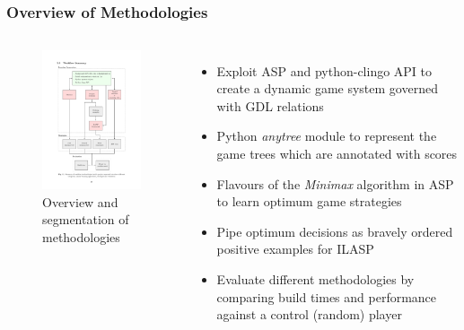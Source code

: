 \documentclass{beamer}
\begin{document}
\subsection{}
\begin{framefont}{\footnotesize}
  \begin{frame}
    \frametitle{Overview of Methodologies}
    \begin{columns}
      \vspace{-20pt}
      \begin{figure}
        \centering
        \includegraphics[trim={3cm 4cm 3cm 3.5cm},clip,width=4.8cm]{workflow.pdf}
        \caption{Overview and segmentation of methodologies}
      \end{figure}
      \vspace{-20pt}
      \begin{itemize}[<+->]
        \setlength\itemsep{1.2em}
      \item Exploit ASP and python-clingo API to create a dynamic game system governed with GDL relations
      \item Python \textit{anytree} module to represent the game trees which are annotated with scores
      \item Flavours of the \textit{Minimax} algorithm in ASP to learn optimum game strategies
      \item Pipe optimum decisions as bravely ordered positive examples for ILASP
      \item Evaluate different methodologies by comparing build times and performance against a control (random) player
      \end{itemize}
    \end{columns}
  \end{frame}
\end{framefont}
\end{document}
